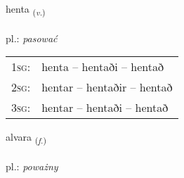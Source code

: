 \documentclass[frontgrid, backgrid]{flacards}\usepackage[]{graphicx}\usepackage[]{xcolor}
\begin{document}
\renewcommand{\flhead}{\vskip5pt \fboxsep=0pt {\small\bfseries\footnotesize Sagnorð | Verb}}
\renewcommand{\fcfoot}{\vskip5pt \fboxsep=0pt \hspace{2pt}{\small\bfseries\footnotesize 2K}}

\renewcommand{\blhead}{\vskip5pt {\small\bfseries\footnotesize Sagnorð | Verb }}
\renewcommand{\bcfoot}{\vskip5pt \hspace{2pt}{\small\bfseries\footnotesize 2K}}


{henta \small{\textsubscript{(\textit{v.})}} \\[1ex] %
\textphonetic{[hɛn̥ta]} \\
pl.: \emph{pasować} \\  [2ex]
\renewcommand*{\arraystretch}{0.8}
\begin{tabular}{p{1cm}l}
\textsc{1sg}: & henta -- hentaði -- hentað \\ 
\textsc{2sg}: & hentar -- hentaðir -- hentað \\ 
\textsc{3sg}: & hentar -- hentaði -- hentað \\ 
\end{tabular}
}

\renewcommand{\flhead}{\vskip5pt \fboxsep=0pt {\small\bfseries\footnotesize Nafnorð | Noun}}
\renewcommand{\fcfoot}{\vskip5pt \fboxsep=0pt \hspace{2pt}{\small\bfseries\footnotesize 2K}}

\renewcommand{\blhead}{\vskip5pt {\small\bfseries\footnotesize Nafnorð | Noun }}
\renewcommand{\bcfoot}{\vskip5pt \hspace{2pt}{\small\bfseries\footnotesize 2K}}


{alvara \small{\textsubscript{(\textit{f.})}} \\[1ex] %
\textphonetic{[alvara]} \\
pl.: \emph{poważny} \\  [2ex]
\renewcommand*{\arraystretch}{0.8}
}
\end{document}
